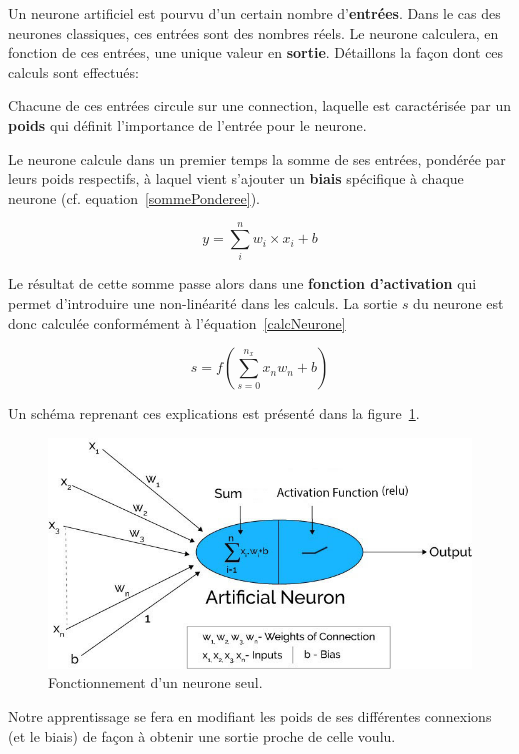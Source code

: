 Un neurone artificiel est pourvu d'un certain nombre d'\textbf{entrées}. Dans le cas des neurones classiques, ces entrées sont des nombres réels. Le neurone calculera, en fonction de ces entrées, une unique valeur en \textbf{sortie}.
Détaillons la façon dont ces calculs sont effectués:

Chacune de ces entrées circule sur une connection, laquelle est caractérisée par un \textbf{poids} qui définit l'importance de l'entrée pour le neurone.

Le neurone calcule dans un premier temps la somme de ses entrées, pondérée par leurs poids respectifs, à laquel vient s'ajouter un \textbf{biais} spécifique à chaque neurone (cf. equation~\ref{sommePonderee}).

\begin{equation}
\label{sommePonderee}
y = \sum_{i}^{n} w_i \times x_i + b
\end{equation}

Le résultat de cette somme passe alors dans une \textbf{fonction d'activation} qui permet d'introduire une non-linéarité dans les calculs. La sortie $s$ du neurone est donc calculée conformément à l'équation~\ref{calcNeurone}

\begin{equation}
\label{calcNeurone}
s = f(\sum_{s=0}^{n_{x}} x_{n}w_{n} + b)
\end{equation}

Un schéma reprenant ces explications est présenté dans la figure~\ref{neuroneSeul}.

\begin{figure}[h]
\includegraphics[width=16.5cm]{./images/image2.jpg}
\caption{Fonctionnement d'un neurone seul.\label{neuroneSeul}}
\end{figure}

Notre apprentissage se fera en modifiant les poids de ses différentes
connexions (et le biais) de façon à obtenir une sortie proche de celle voulu.\newline

